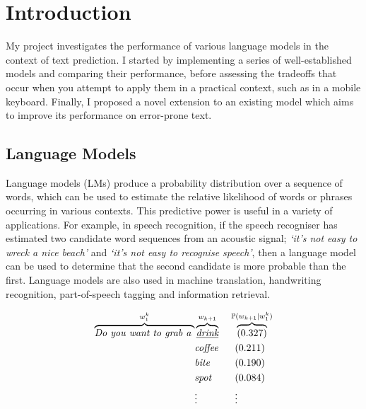 \documentclass[a4paper, 12pt]{report}
\newcommand{\tit}[1]{\textit{#1}}
\begin{document}
\tableofcontents

\listoffigures



\pagestyle{headings}

\chapter{Introduction}

My project investigates the performance of various language models in the context of text prediction. I started by implementing a series of well-established models and comparing their performance, before assessing the tradeoffs that occur when you attempt to apply them in a practical context, such as in a mobile keyboard. Finally, I proposed a novel extension to an existing model which aims to improve its performance on error-prone text.

\section{Language Models}

Language models (LMs) produce a probability distribution over a sequence of words, which can be used to estimate the relative likelihood of words or phrases occurring in various contexts. This predictive power is useful in a variety of applications. For example, in speech recognition, if the speech recogniser has estimated two candidate word sequences from an acoustic signal; \tit{`it's not easy to wreck a nice beach'} and \tit{`it's not easy to recognise speech'}, then a language model can be used to determine that the second candidate is more probable than the first. Language models are also used in machine translation, handwriting recognition, part-of-speech tagging and information retrieval.

\begin{alignat*}{2}
	\overbrace{\tit{Do you want to grab a }}^{w_1^k}&\overbrace{\underline{\tit{drink}}}^{w_{k+1}} &&\hspace{0.5mm}\overbrace{(0.327)}^{\mathbb{P}(w_{k + 1} | w_1^k)} \\
	&\tit{coffee} &&\ \ (0.211) \\
	&\tit{bite} &&\ \ (0.190) \\
	&\tit{spot} &&\ \ (0.084) \\
	&\vdots &&\ \ \vdots
\end{alignat*}
\end{document}
